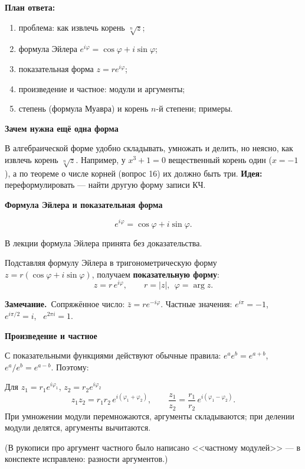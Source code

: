\documentclass[a4paper,11pt]{article}
\newcommand{\zam}{\par\smallskip\noindent\textbf{\textcolor{zamc}{Замечание.}}\ }
\newcommand{\podr}[1]{\par\needspace{8\baselineskip}\medskip
  {\large\bfseries\textcolor{oprc!80!black}{#1}}\par\nopagebreak\smallskip}
\newcommand{\plan}[1]{\begin{planbox}\textbf{План ответа:}
  \begin{enumerate}[nosep,leftmargin=*,label=\arabic*)]#1\end{enumerate}\end{planbox}}
\begin{document}
\plan{\item проблема: как извлечь корень $\sqrt[n]{z}$;
\item формула Эйлера $e^{i\varphi} = \cos\varphi + i\sin\varphi$;
\item показательная форма $z = re^{i\varphi}$;
\item произведение и частное: модули и аргументы;
\item степень (формула Муавра) и корень $n$-й степени; примеры.}

\podr{Зачем нужна ещё одна форма}

В алгебраической форме удобно складывать, умножать и делить, но неясно, как извлечь корень $\sqrt[n]{z}$.
Например, у $x^3 + 1 = 0$ вещественный корень один ($x = -1$), а по теореме о числе корней (вопрос 16) их должно быть три.
\textbf{Идея:} переформулировать --- найти другую форму записи КЧ.

\podr{Формула Эйлера и показательная форма}

\begin{teo}
\[
  e^{i\varphi} = \cos\varphi + i\sin\varphi.
\]
\end{teo}

{\small\textcolor{zamc}{В лекции формула Эйлера принята без доказательства.}}

\begin{opr}
Подставляя формулу Эйлера в тригонометрическую форму $z = r(\cos\varphi + i\sin\varphi)$, получаем
\textbf{показательную форму}:
\[
  z = r\, e^{i\varphi}, \qquad r = |z|, \ \ \varphi = \arg z.
\]
\end{opr}

\zam Сопряжённое число: $\bar z = r e^{-i\varphi}$. Частные значения: $e^{i\pi} = -1$, \ $e^{i\pi/2} = i$, \ $e^{2\pi i} = 1$.

\podr{Произведение и частное}

С показательными функциями действуют обычные правила: $e^a e^b = e^{a+b}$, \ $e^a / e^b = e^{a-b}$. Поэтому:

\begin{teo}
Для $z_1 = r_1 e^{i\varphi_1}$, $z_2 = r_2 e^{i\varphi_2}$
\[
  z_1 z_2 = r_1 r_2\, e^{i(\varphi_1 + \varphi_2)}, \qquad \frac{z_1}{z_2} = \frac{r_1}{r_2}\, e^{i(\varphi_1 - \varphi_2)}.
\]
При умножении модули перемножаются, аргументы складываются; при делении модули делятся, аргументы вычитаются.
\end{teo}

{\small\textcolor{zamc}{(В рукописи про аргумент частного было написано <<частному модулей>> --- в конспекте исправлено: разности аргументов.)}}
\end{document}

